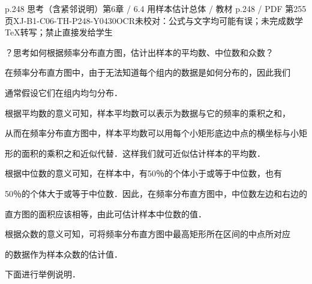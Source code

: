 \begin{bankitem}{p.248 思考（含紧邻说明）}{第6章 / 6.4 用样本估计总体 / 教材 p.248 / PDF 第255页}{XJ-B1-C06-TH-P248-Y0430}{OCR未校对：公式与文字均可能有误；未完成数学TeX转写；禁止直接发给学生}
\begin{ocrdraft}
\par
？思考如何根据频率分布直方图，估计出样本的平均数、中位数和众数？
\par
在频率分布直方图中，由于无法知道每个组内的数据是如何分布的，因此我们
\par
通常假设它们在组内均匀分布．
\par
根据平均数的意义可知，样本平均数可以表示为数据与它的频率的乘积之和，
\par
从而在频率分布直方图中，样本平均数可以用每个小矩形底边中点的横坐标与小矩
\par
形的面积的乘积之和近似代替．这样我们就可近似估计样本的平均数．
\par
根据中位数的意义可知，在样本中，有50％的个体小于或等于中位数，也有
\par
50％的个体大于或等于中位数．因此，在频率分布直方图中，中位数左边和右边的
\par
直方图的面积应该相等，由此可估计样本中位数的值．
\par
根据众数的意义可知，可将频率分布直方图中最高矩形所在区间的中点所对应
\par
的数据作为样本众数的估计值．
\par
下面进行举例说明．
\end{ocrdraft}
\end{bankitem}
